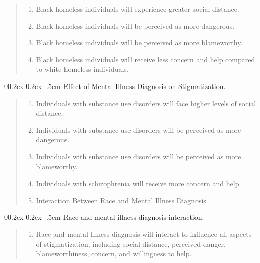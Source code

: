 \documentclass[
  man,
  floatsintext,
  longtable,
  nolmodern,
  notxfonts,
  notimes,
  colorlinks=true,linkcolor=blue,citecolor=blue,urlcolor=blue]{apa7}
\makeatletter
\renewcommand{\paragraph}{\@startsection{paragraph}{4}{\parindent}%
	{0\baselineskip \@plus 0.2ex \@minus 0.2ex}%
	{-.5em}%
	{\normalfont\normalsize\bfseries\typesectitle}}
\providecommand{\tightlist}{%
  \setlength{\itemsep}{0pt}\setlength{\parskip}{0pt}}
\makeatother
\begin{document}
\begin{quote}
\begin{enumerate}
\def\labelenumi{\arabic{enumi}.}
\tightlist
\item
  Black homeless individuals will experience greater social distance.
\item
  Black homeless individuals will be perceived as more dangerous.
\item
  Black homeless individuals will be perceived as more blameworthy.
\item
  Black homeless individuals will receive less concern and help compared
  to white homeless individuals.
\end{enumerate}
\end{quote}

\paragraph{Effect of Mental Illness Diagnosis on
Stigmatization.}\label{effect-of-mental-illness-diagnosis-on-stigmatization}

\begin{quote}
\begin{enumerate}
\def\labelenumi{\arabic{enumi}.}
\tightlist
\item
  Individuals with substance use disorders will face higher levels of
  social distance.
\item
  Individuals with substance use disorders will be perceived as more
  dangerous.
\item
  Individuals with substance use disorders will be perceived as more
  blameworthy.
\item
  Individuals with schizophrenia will receive more concern and help.
\item
  Interaction Between Race and Mental Illness Diagnosis
\end{enumerate}
\end{quote}

\paragraph{Race and mental illness diagnosis
interaction.}\label{race-and-mental-illness-diagnosis-interaction}

\begin{quote}
\begin{enumerate}
\def\labelenumi{\arabic{enumi}.}
\tightlist
\item
  Race and mental Illness diagnosis will interact to influence all
  aspects of stigmatization, including social distance, perceived
  danger, blameworthiness, concern, and willingness to help.
\end{enumerate}
\end{quote}
\end{document}
